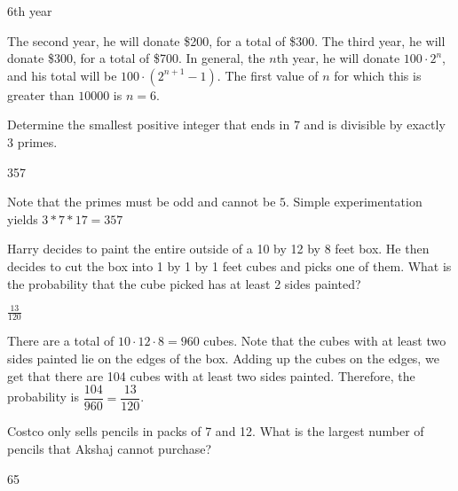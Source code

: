 \documentclass[11pt]{article}
\begin{document}
\begin{answer}
6th year
\end{answer}

\begin{solution}
The second year, he will donate \$200, for a total of \$300. The third year, he will donate \$300, for a total of \$700. In general, the $n$th year, he will donate $100 \cdot 2^n$, and his total will be $100 \cdot (2^{n+1} - 1)$. The first value of $n$ for which this is greater than $10000$ is $n = 6$.
\end{solution}

\begin{problem}
Determine the smallest positive integer that ends in $7$ and is divisible by exactly 3 primes.
\end{problem}

\begin{answer}
357
\end{answer}

\begin{solution}
Note that the primes must be odd and cannot be $5$. Simple experimentation yields $3*7*17 = 357$
\end{solution}


\begin{problem}
Harry decides to paint the entire outside of a 10 by 12 by 8 feet box. He then decides to cut the box into 1 by 1 by 1 feet cubes and picks one of them. What is the probability that the cube picked has at least 2 sides painted? 
\end{problem}

\begin{answer}
$\frac{13}{120}$
\end{answer}

\begin{solution}
There are a total of $10 \cdot 12 \cdot 8 = 960$ cubes. Note that the cubes with at least two sides painted lie on the edges of the box. Adding up the cubes on the edges, we get that there are 104 cubes with at least two sides painted. Therefore, the probability is $\dfrac{104}{960} = \dfrac{13}{120}$.
\end{solution}


\begin{problem}
Costco only sells pencils in packs of 7 and 12. What is the largest number of pencils that Akshaj cannot purchase?
\end{problem}

\begin{answer}
65
\end{answer}
\end{document}
